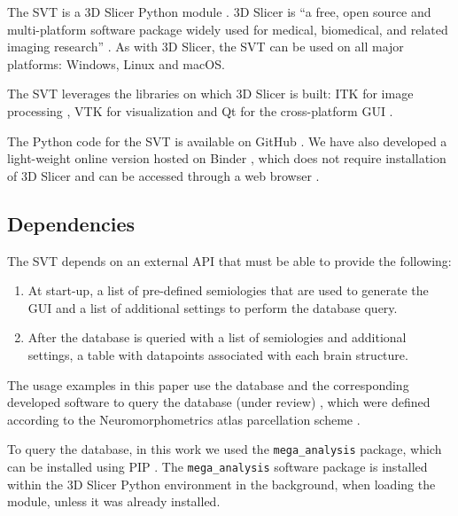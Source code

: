 The \ac{SVT} is a 3D Slicer Python module \cite{fedorov_3d_2012}.
3D Slicer is ``a free, open source and multi-platform software package widely used for medical, biomedical, and related imaging research''%
.
As with 3D Slicer, the \ac{SVT} can be used on all major platforms: Windows, Linux and macOS.

The \ac{SVT} leverages the libraries on which 3D Slicer is built:
\ac{ITK} for image processing \cite{mccormick_itk_2014},
\ac{VTK} for visualization \cite{schroeder_visualization_2006}
and Qt for the cross-platform \ac{GUI}%
.

The Python code for the \ac{SVT} is available on GitHub%
\fnurl{\svtgithubtagged}.
We have also developed a light-weight online version hosted on Binder \cite{bussonnier_binder_2018}, which does not require installation of 3D Slicer and can be accessed through a web browser%
\fnurl{\svtweb}.


\subsection{Dependencies}
\label{sec:svt_dependencies}

The \ac{SVT} depends on an external \ac{API} that must be able to provide the following:
\begin{enumerate}
  \item At start-up, a list of pre-defined semiologies that are used to generate the \ac{GUI} and a list of additional settings to perform the database query.
  \item After the database is queried with a list of semiologies and additional settings, a table with datapoints associated with each brain structure.
\end{enumerate}

The usage examples in this paper use the \svtdatabase database and the corresponding developed software to query the database \cite{alim-marvasti_cortical_2022} (under review) \cite{alim-marvasti_probabilistic_2022}, which were defined according to the Neuromorphometrics atlas parcellation scheme%
.

To query the \svtdatabase database, in this work we used the \texttt{mega\_analysis} package, which can be installed using \ac{PIP} \cite{alim-marvasti_cortical_2022}.
The \texttt{mega\_analysis} software package is installed within the 3D Slicer Python environment in the background, when loading the module, unless it was already installed.


